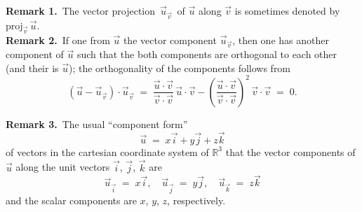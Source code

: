 \documentclass[12pt]{article}
\theoremstyle{definition}
\begin{document}
\textbf{Remark 1.}\, The vector projection\, $\vec{u}_{\vec{v}}$\, of $\vec{u}$ along $\vec{v}$ is sometimes denoted by\, $\mbox{proj}_{\vec{v}}\,\vec{u}$.\\

\textbf{Remark 2.}\, If one  from $\vec{u}$ the vector component $\vec{u}_{\vec{v}}$, then one has another component of $\vec{u}$ such that the both components are orthogonal to each other (and their  is $\vec{u}$); the orthogonality of the components follows from
$$(\vec{u}-\vec{u}_{\vec{v}})\cdot\vec{u}_{\vec{v}} \;=\; 
\frac{\vec{u}\cdot\vec{v}}{\vec{v}\cdot\vec{v}}\,\vec{u}\cdot\vec{v}
-\left(\frac{\vec{u}\cdot\vec{v}}{\vec{v}\cdot\vec{v}}\right)^2\,\vec{v}\cdot\vec{v} \;=\; 0.$$

\textbf{Remark 3.}\, The usual ``component form'' 
$$\vec{u} \;=\; x\vec{i}+y\vec{j}+z\vec{k}$$
of vectors in the cartesian coordinate system of $\mathbb{R}^3$  that the  vector components of $\vec{u}$ along the unit vectors $\vec{i}$, $\vec{j}$, $\vec{k}$ are 
$$\vec{u}_{\vec{i}} \;=\; x\vec{i}, \quad \vec{u}_{\vec{j}} \;=\; y\vec{j}, \quad \vec{u}_{\vec{k}} \;=\; z\vec{k}$$
and the scalar components are $x$, $y$, $z$, respectively.

\end{document}
